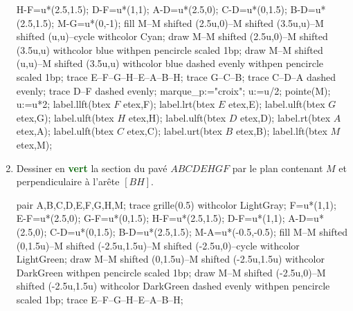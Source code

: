 \begin{corrige}
\begin{enumerate}
\begin{center}
\begin{Geometrie}[CoinBG={(.5u,.5u)},CoinHD={(5u,4u)}]
                H-F=u*(2.5,1.5);
                D-F=u*(1,1);
                A-D=u*(2.5,0);
                C-D=u*(0,1.5);
                B-D=u*(2.5,1.5);
                M-G=u*(0,-1);
                fill M--M shifted (2.5u,0)--M shifted (3.5u,u)--M shifted (u,u)--cycle withcolor Cyan;
                draw M--M shifted (2.5u,0)--M shifted (3.5u,u) withcolor blue withpen pencircle scaled 1bp;
                draw M--M shifted (u,u)--M shifted (3.5u,u) withcolor blue dashed evenly withpen pencircle scaled 1bp;                
                trace E--F--G--H--E--A--B--H;
                trace G--C--B;
                trace C--D--A dashed evenly;
                trace D--F dashed evenly;
                marque_p:="croix";
                u:=u/2;
                pointe(M);
                u:=u*2;
                label.llft(btex $F$ etex,F);
                label.lrt(btex $E$ etex,E);
                label.ulft(btex $G$ etex,G);
                label.ulft(btex $H$ etex,H);
                label.ulft(btex $D$ etex,D);
                label.rt(btex $A$ etex,A);
                label.ulft(btex $C$ etex,C);
                label.urt(btex $B$ etex,B);
                label.lft(btex $M$ etex,M);
            \end{Geometrie}
        \end{center}
        \item Dessiner en \textcolor{DarkGreen}{\textbf{vert}} la section du pavé $ABCDEHGF$ par le plan contenant $M$ et perpendiculaire à l'arête $[BH]$.
        \begin{center}           
            \begin{Geometrie}[CoinBG={(.5u,.5u)},CoinHD={(5u,4u)}]
                pair A,B,C,D,E,F,G,H,M;
                trace grille(0.5) withcolor LightGray;
                F=u*(1,1);
                E-F=u*(2.5,0);
                G-F=u*(0,1.5);
                H-F=u*(2.5,1.5);
                D-F=u*(1,1);
                A-D=u*(2.5,0);
                C-D=u*(0,1.5);
                B-D=u*(2.5,1.5);
                M-A=u*(-0.5,-0.5);
                fill M--M shifted (0,1.5u)--M shifted (-2.5u,1.5u)--M shifted (-2.5u,0)--cycle withcolor LightGreen;
                draw M--M shifted (0,1.5u)--M shifted (-2.5u,1.5u) withcolor DarkGreen withpen pencircle scaled 1bp;
                draw M--M shifted (-2.5u,0)--M shifted (-2.5u,1.5u) withcolor DarkGreen dashed evenly withpen pencircle scaled 1bp;                
                trace E--F--G--H--E--A--B--H;

\end{Geometrie}
\end{center}
\end{enumerate}
\end{corrige}
